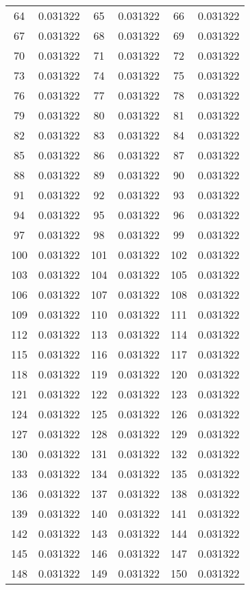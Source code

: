 \documentclass[12pt]{article}
\begin{document}
\begin{longtable}{@{}cc|cc|cc@{}}
64 & 0.031322 & 65 & 0.031322 & 66 & 0.031322 \\
67 & 0.031322 & 68 & 0.031322 & 69 & 0.031322 \\
70 & 0.031322 & 71 & 0.031322 & 72 & 0.031322 \\
73 & 0.031322 & 74 & 0.031322 & 75 & 0.031322 \\
76 & 0.031322 & 77 & 0.031322 & 78 & 0.031322 \\
79 & 0.031322 & 80 & 0.031322 & 81 & 0.031322 \\
82 & 0.031322 & 83 & 0.031322 & 84 & 0.031322 \\
85 & 0.031322 & 86 & 0.031322 & 87 & 0.031322 \\
88 & 0.031322 & 89 & 0.031322 & 90 & 0.031322 \\
91 & 0.031322 & 92 & 0.031322 & 93 & 0.031322 \\
94 & 0.031322 & 95 & 0.031322 & 96 & 0.031322 \\
97 & 0.031322 & 98 & 0.031322 & 99 & 0.031322 \\
100 & 0.031322 & 101 & 0.031322 & 102 & 0.031322 \\
103 & 0.031322 & 104 & 0.031322 & 105 & 0.031322 \\
106 & 0.031322 & 107 & 0.031322 & 108 & 0.031322 \\
109 & 0.031322 & 110 & 0.031322 & 111 & 0.031322 \\
112 & 0.031322 & 113 & 0.031322 & 114 & 0.031322 \\
115 & 0.031322 & 116 & 0.031322 & 117 & 0.031322 \\
118 & 0.031322 & 119 & 0.031322 & 120 & 0.031322 \\
121 & 0.031322 & 122 & 0.031322 & 123 & 0.031322 \\
124 & 0.031322 & 125 & 0.031322 & 126 & 0.031322 \\
127 & 0.031322 & 128 & 0.031322 & 129 & 0.031322 \\
130 & 0.031322 & 131 & 0.031322 & 132 & 0.031322 \\
133 & 0.031322 & 134 & 0.031322 & 135 & 0.031322 \\
136 & 0.031322 & 137 & 0.031322 & 138 & 0.031322 \\
139 & 0.031322 & 140 & 0.031322 & 141 & 0.031322 \\
142 & 0.031322 & 143 & 0.031322 & 144 & 0.031322 \\
145 & 0.031322 & 146 & 0.031322 & 147 & 0.031322 \\
148 & 0.031322 & 149 & 0.031322 & 150 & 0.031322 \\

\end{longtable}
\end{document}
